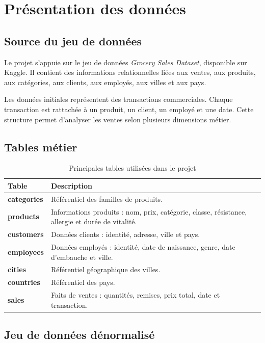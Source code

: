 \documentclass[12pt,a4paper,twoside]{report}
\begin{document}
\chapter{Présentation des données}

\section{Source du jeu de données}

Le projet s'appuie sur le jeu de données \textit{Grocery Sales Dataset}, disponible sur Kaggle. Il contient des informations relationnelles liées aux ventes, aux produits, aux catégories, aux clients, aux employés, aux villes et aux pays.

Les données initiales représentent des transactions commerciales. Chaque transaction est rattachée à un produit, un client, un employé et une date. Cette structure permet d'analyser les ventes selon plusieurs dimensions métier.

\section{Tables métier}

\begin{table}[H]
\centering
{}
\begin{tabularx}{\textwidth}{>{\bfseries}p{3.3cm}X}
\toprule
\rowcolor{TableHeader}
\color{white}Table & \color{white}Description \\
\midrule
categories & Référentiel des familles de produits. \\
products & Informations produits : nom, prix, catégorie, classe, résistance, allergie et durée de vitalité. \\
customers & Données clients : identité, adresse, ville et pays. \\
employees & Données employés : identité, date de naissance, genre, date d'embauche et ville. \\
cities & Référentiel géographique des villes. \\
countries & Référentiel des pays. \\
sales & Faits de ventes : quantités, remises, prix total, date et transaction. \\
\bottomrule
\end{tabularx}
\caption{Principales tables utilisées dans le projet}
\end{table}

\section{Jeu de données dénormalisé}
\end{document}
